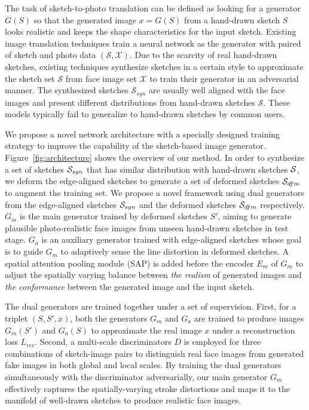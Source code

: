 % 

The task of sketch-to-photo translation can be defined as looking for a generator $G(S)$ so that the generated image $x=G(S)$ from a hand-drawn sketch $S$ looks realistic and keeps the shape characteristics for the input sketch.
%
Existing image translation techniques train a neural network as the generator with paired of sketch and photo data $(\mathcal{S}, \mathcal{X})$.
%
Due to the scarcity of real hand-drawn sketches, existing techniques synthesize sketches in a certain style to approximate the sketch set $\mathcal{S}$ from face image set $\mathcal{X}$ to train their generator in an adversarial manner.
The synthesized sketches $\mathcal{S}_{syn}$ are usually well aligned with the face images and present different distributions from hand-drawn sketches $\mathcal{S}$.
These models typically fail to generalize to hand-drawn sketches by common users. 
%


We propose a novel network architecture with a specially designed training strategy to improve the capability of the sketch-based image generator.
%
Figure~\ref{fig:architecture} shows the overview of our method.
%
In order to synthesize a set of sketches $\mathcal{S}_{syn}$ that has similar distribution with hand-drawn sketches $\mathcal{S}$, we deform the edge-aligned sketches to generate a set of deformed sketches $\mathcal{S}_{dfm}$ to augment the training set.
We propose a novel framework using dual generators from the edge-aligned sketches $\mathcal{S}_{syn}$ and the deformed sketches $\mathcal{S}_{dfm}$ respectively.
%
$G_m$ is the main generator trained by deformed sketches $S'$, aiming to generate plausible photo-realistic face images from unseen hand-drawn sketches in test stage. 
$G_a$ is an auxiliary generator trained with edge-aligned sketches whose goal is to guide $G_m$ to adaptively sense the line distortion in deformed sketches.
%
A spatial attention pooling module (SAP) is added before the encoder $E_m$ of $G_m$ to adjust the spatially varying balance between \textit{the realism} of generated images and \textit{the conformance} between the generated image and the input sketch. 
%

The dual generators are trained together under a set of supervision. 
First, for a triplet $(S,S',x)$, both the generators $G_m$ and $G_a$ are trained to produce images $G_m(S')$ and $G_a(S)$ to approximate the real image $x$ under a reconstruction loss $L_{rec}$. 
Second, a multi-scale discriminators $D$ is employed for three combinations of sketch-image pairs to distinguish real face images from generated fake images in both global and local scales. 
By training the dual generators simultaneously with the discriminator adversarially, our main generator $G_m$ effectively captures the spatially-varying stroke distortions and maps it to the manifold of well-drawn sketches to produce realistic face images.


